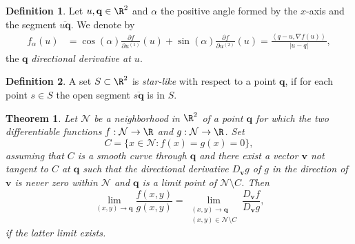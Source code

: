 \documentclass[sort&compress, preprint]{elsarticle}
\theoremstyle{definition}
\newtheorem{dfn}{Definition}[section]
\theoremstyle{plain}%
\newtheorem{thm}{Theorem}[section]
\theoremstyle{remark}
\newcommand{\innerprod}[2]{\left\langle#1, #2\right\rangle}
\begin{document}
\begin{dfn}
	Let $u,\mathbf{q}\in \R^2$ and $\alpha$ the positive angle formed by the $x$-axis and the segment
	$\overline{u \mathbf{q}}$.	We denote by 
	\begin{align*}
		f_{\alpha}(u) &= 
			\cos(\alpha) 		
			\frac{\partial f}{\partial u^{(1)}}(u) + 
			\sin(\alpha)
			\frac{\partial f}{\partial u^{(2)}}(u) 
			= \frac{ \innerprod{q-u}{\nabla f(u)}}{|u-q|},			
	\end{align*}
	the $\mathbf{q}$ \emph{directional derivative at $u$}.
\end{dfn}
\begin{dfn}
	A set $S\subset \R^2$ is \emph{star-like} with respect to a point $\mathbf{q}$, if for each point $s \in S$ the open 
	segment $\overline{s \mathbf{q}}$ is in $S$.
\end{dfn}

\begin{thm}\label{thm:Lawlor}
	Let $\mathcal{N}$ be a neighborhood in $\R^2$ of a point $\mathbf{q}$ for  which
	the two differentiable functions $f:\mathcal{N}\to \R$ and $g:\mathcal{N}\to \R$. Set 
	$$
		C=\{x \in \mathcal{N}: f(x)=g(x)=0 \},
	$$
	assuming that $C$ is a smooth curve through $\mathbf{q}$ and 	
	there exist a vector $\mathbf{v}$ not tangent to $C$ at $\mathbf{q}$
	such that the directional derivative $D_{\mathbf{v}}g$ of $g$ in the direction of $\mathbf{v}$ 
	is never zero within $\mathcal{N}$ and $\mathbf{q}$ is a limit point of $\mathcal{N}\setminus C$. Then
	\begin{equation*}
		\lim_{(x,y)\to \mathbf{q}}
		\frac{f(x,y)}{g(x,y)} =
		\lim_{
				\substack{
					(x,y)\to \mathbf{q}\\ 
					(x,y)\in \mathcal{N} \setminus C
				}
		}
		\frac{D_{\mathbf{v}} f }{D_{\mathbf{v}} g},
	\end{equation*}
	if the latter limit exists.
\end{thm}
\end{document}
